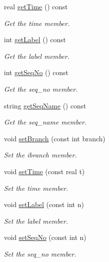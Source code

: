 \begin{DoxyCompactItemize}
real \hyperlink{classPhyloNode_a00c2267514e0f9ca175de697a15698b3}{get\-Time} () const 
\begin{DoxyCompactList}\small\item\em \-Get the time member. \end{DoxyCompactList}\item 
int \hyperlink{classPhyloNode_a7b0378a66e2acf414820eb25eddb0dcc}{get\-Label} () const 
\begin{DoxyCompactList}\small\item\em \-Get the label member. \end{DoxyCompactList}\item 
int \hyperlink{classPhyloNode_a3fc253c8d09bf7d7cf1da885c1eaec4c}{get\-Seq\-No} () const 
\begin{DoxyCompactList}\small\item\em \-Get the seq\-\_\-no member. \end{DoxyCompactList}\item 
string \hyperlink{classPhyloNode_af9113f5f2b37eb169e982f8b8033d3f6}{get\-Seq\-Name} () const 
\begin{DoxyCompactList}\small\item\em \-Get the seq\-\_\-name member. \end{DoxyCompactList}\item 
void \hyperlink{classPhyloNode_a9744c7676674e8e988449bda24808d54}{set\-Branch} (const int branch)
\begin{DoxyCompactList}\small\item\em \-Set the ibranch member. \end{DoxyCompactList}\item 
void \hyperlink{classPhyloNode_ac1e882ec990671ad78dc76218aa80610}{set\-Time} (const real t)
\begin{DoxyCompactList}\small\item\em \-Set the time member. \end{DoxyCompactList}\item 
void \hyperlink{classPhyloNode_ab5fcae88b5e5a29c0619b2f1b85958be}{set\-Label} (const int n)
\begin{DoxyCompactList}\small\item\em \-Set the label member. \end{DoxyCompactList}\item 
void \hyperlink{classPhyloNode_a30b68416bbeabe566b2d17ef43ff753c}{set\-Seq\-No} (const int n)
\begin{DoxyCompactList}\small\item\em \-Set the seq\-\_\-no member. \end{DoxyCompactList}\item 

\end{DoxyCompactItemize}
